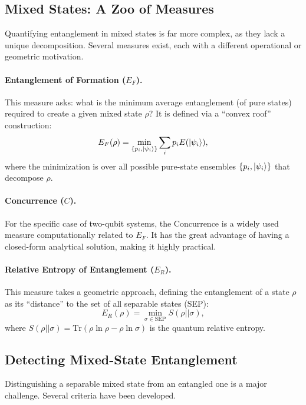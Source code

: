 \subsection{Mixed States: A Zoo of Measures}
\label{sub:mixed_state_measures}
Quantifying entanglement in mixed states is far more complex, as they lack
a unique decomposition. Several measures exist, each with a different
operational or geometric motivation.

\paragraph{Entanglement of Formation ($E_F$).}
This measure asks: what is the minimum average entanglement (of pure states)
required to create a given mixed state $\rho$? It is defined via a
``convex roof'' construction:
\begin{equation}
	E_F(\rho) = \min_{\{p_i, \ket{\psi_i}\}} \sum_i p_i E(\ket{\psi_i}),
\end{equation}
where the minimization is over all possible pure-state ensembles
$\{p_i, \ket{\psi_i}\}$ that decompose $\rho$.

\paragraph{Concurrence ($C$).}
For the specific case of two-qubit systems, the Concurrence is a widely
used measure computationally related to $E_F$. It has the great advantage
of having a closed-form analytical solution, making it highly practical.

\paragraph{Relative Entropy of Entanglement ($E_R$).}
This measure takes a geometric approach, defining the entanglement of a
state $\rho$ as its ``distance'' to the set of all separable states (SEP):
\begin{equation}
	E_R(\rho) = \min_{\sigma \in \text{SEP}} S(\rho || \sigma),
\end{equation}
where $S(\rho || \sigma) = \mathrm{Tr}(\rho \ln \rho - \rho \ln \sigma)$ is
the quantum relative entropy.

\subsection{Detecting Mixed-State Entanglement}
\label{sub:detecting_entanglement}
Distinguishing a separable mixed state from an entangled one is a major
challenge. Several criteria have been developed.

